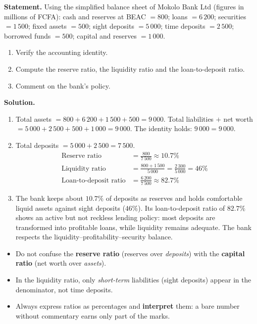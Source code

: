 \documentclass[11pt]{article}
\begin{document}
\begin{exoresolu}
\textbf{Statement.} Using the simplified balance sheet of Mokolo Bank Ltd (figures in millions of FCFA): cash and reserves at BEAC $= 800$; loans $= 6\,200$; securities $= 1\,500$; fixed assets $= 500$; sight deposits $= 5\,000$; time deposits $= 2\,500$; borrowed funds $= 500$; capital and reserves $= 1\,000$.
\begin{enumerate}
\item Verify the accounting identity.
\item Compute the reserve ratio, the liquidity ratio and the loan-to-deposit ratio.
\item Comment on the bank's policy.
\end{enumerate}
\tcblower
\textbf{Solution.}
\begin{enumerate}
\item Total assets $= 800 + 6\,200 + 1\,500 + 500 = 9\,000$. Total liabilities $+$ net worth $= 5\,000 + 2\,500 + 500 + 1\,000 = 9\,000$. The identity holds: $9\,000 = 9\,000$.
\item Total deposits $= 5\,000 + 2\,500 = 7\,500$.
\begin{align*}
\text{Reserve ratio} &= \frac{800}{7\,500} \approx 10.7\% \\
\text{Liquidity ratio} &= \frac{800 + 1\,500}{5\,000} = \frac{2\,300}{5\,000} = 46\% \\
\text{Loan-to-deposit ratio} &= \frac{6\,200}{7\,500} \approx 82.7\%
\end{align*}
\item The bank keeps about $10.7\%$ of deposits as reserves and holds comfortable liquid assets against sight deposits ($46\%$). Its loan-to-deposit ratio of $82.7\%$ shows an active but not reckless lending policy: most deposits are transformed into profitable loans, while liquidity remains adequate. The bank respects the liquidity--profitability--security balance.
\end{enumerate}
\end{exoresolu}

\begin{attention}
\begin{itemize}
\item Do not confuse the \textbf{reserve ratio} (reserves over \emph{deposits}) with the \textbf{capital ratio} (net worth over \emph{assets}).
\item In the liquidity ratio, only \emph{short-term} liabilities (sight deposits) appear in the denominator, not time deposits.
\item Always express ratios as percentages and \textbf{interpret} them: a bare number without commentary earns only part of the marks.
\end{itemize}
\end{attention}
\end{document}
